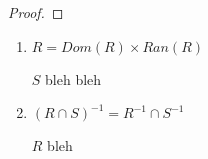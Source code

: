 

\begin{theorem}
\end{theorem}

\begin{proof}
\end{proof}

\begin{enumerate}[label=\alph*]
  \item $R=Dom(R) \times Ran(R)$

    $S$ bleh bleh

  \item $(R \cap S)^{-1}=R^{-1} \cap S^{-1}$

    $R$ bleh
\end{enumerate}
